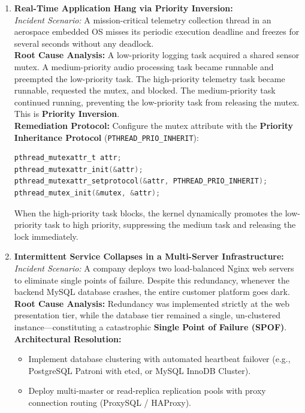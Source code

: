 \begin{enumerate}[label=\textbf{Case \arabic*.},leftmargin=1.5cm]
\item \textbf{Real-Time Application Hang via Priority Inversion:} \\
\textit{Incident Scenario:} A mission-critical telemetry collection thread in an aerospace embedded OS misses its periodic execution deadline and freezes for several seconds without any deadlock. \\
\textbf{Root Cause Analysis:} A low-priority logging task acquired a shared sensor mutex. A medium-priority audio processing task became runnable and preempted the low-priority task. The high-priority telemetry task became runnable, requested the mutex, and blocked. The medium-priority task continued running, preventing the low-priority task from releasing the mutex. This is \textbf{Priority Inversion}. \\
\textbf{Remediation Protocol:} Configure the mutex attribute with the \textbf{Priority Inheritance Protocol} (\texttt{PTHREAD\_PRIO\_INHERIT}):
\begin{lstlisting}[language=C]
pthread_mutexattr_t attr;
pthread_mutexattr_init(&attr);
pthread_mutexattr_setprotocol(&attr, PTHREAD_PRIO_INHERIT);
pthread_mutex_init(&mutex, &attr);
\end{lstlisting}
When the high-priority task blocks, the kernel dynamically promotes the low-priority task to high priority, suppressing the medium task and releasing the lock immediately.

\item \textbf{Intermittent Service Collapses in a Multi-Server Infrastructure:} \\
\textit{Incident Scenario:} A company deploys two load-balanced Nginx web servers to eliminate single points of failure. Despite this redundancy, whenever the backend MySQL database crashes, the entire customer platform goes dark. \\
\textbf{Root Cause Analysis:} Redundancy was implemented strictly at the web presentation tier, while the database tier remained a single, un-clustered instance—constituting a catastrophic \textbf{Single Point of Failure (SPOF)}. \\
\textbf{Architectural Resolution:}
\begin{itemize}
    \item Implement database clustering with automated heartbeat failover (e.g., PostgreSQL Patroni with etcd, or MySQL InnoDB Cluster).
    \item Deploy multi-master or read-replica replication pools with proxy connection routing (ProxySQL / HAProxy).
\end{itemize}


\end{enumerate}
